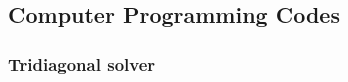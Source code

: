 \documentclass[12pt]{article}
\numberwithin{equation}{subsection} %
\newcommand{\appen}[1]{%
\cleardoublepage
\clearpage
\newpage
\begin{center}
\addtocounter{section} {1}
\renewcommand{\thesection}{\Alph{section}}
\setcounter{subsection} {0}
\setcounter{table}{0}
\section* {\normalsize \bf{APPENDIX \thesection \\ #1}}
\addcontentsline{toc}{section}{APPENDIX
\protect\numberline{\thesection : } #1\dotfill}
\end{center}
\renewcommand{\thesubsection}{\Alph{section}.\arabic{subsection}}
\renewcommand{\thesubsubsection}{\Alph{section}.\arabic{subsection}.\arabic{subsubsection}}
\renewcommand{\theequation}{\Alph{section}.\arabic{equation}}
\renewcommand{\thetable}{\Alph{section}.\arabic{table}}

\thispagestyle{myheadings} }
\begin{document}




\newpage








\subsection{Computer Programming Codes}
\subsubsection{Tridiagonal solver}

%
%
%
%
\end{document}
